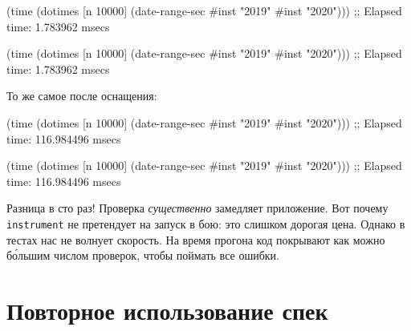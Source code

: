 
\ifx\DEVICETYPE\MOBILE

\begin{english}
  \begin{clojure}
(time
 (dotimes [n 10000]
   (date-range-sec #inst "2019"
                   #inst "2020")))
;; Elapsed time: 1.783962 msecs
  \end{clojure}
\end{english}

\else

\begin{english}
  \begin{clojure}
(time
 (dotimes [n 10000]
   (date-range-sec #inst "2019" #inst "2020")))
;; Elapsed time: 1.783962 msecs
  \end{clojure}
\end{english}

\fi

\noindent
То же самое после оснащения:

\ifx\DEVICETYPE\MOBILE

\begin{english}
  \begin{clojure}
(time
 (dotimes [n 10000]
   (date-range-sec #inst "2019"
                   #inst "2020")))
;; Elapsed time: 116.984496 msecs
  \end{clojure}
\end{english}

\else

\begin{english}
  \begin{clojure}
(time
 (dotimes [n 10000]
   (date-range-sec #inst "2019" #inst "2020")))
;; Elapsed time: 116.984496 msecs
  \end{clojure}
\end{english}

\fi


Разница в сто раз! Проверка \emph{существенно} замедляет приложение. Вот почему
\verb|instrument| не претендует на запуск в бою: это слишком дорогая
цена. Однако в тестах нас не волнует скорость. На время прогона код покрывают
как можно б\'{о}льшим числом проверок, чтобы поймать все ошибки.

\section{Повторное использование спек}

